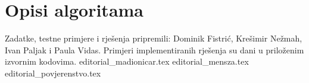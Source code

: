 \documentclass[a4paper]{article}
\date{May 29th 2022.}
\begin{document}
\section*{Opisi algoritama}
Zadatke, testne primjere i rješenja pripremili: Dominik Fistrić, Krešimir
Nežmah, Ivan Paljak i Paula Vidas.  Primjeri implementiranih rješenja su dani
u priloženim izvornim kodovima.
{editorial_madionicar.tex}
\clearpage
{editorial_mensza.tex}
\clearpage
{editorial_povjerenstvo.tex}
\clearpage
\end{document}
